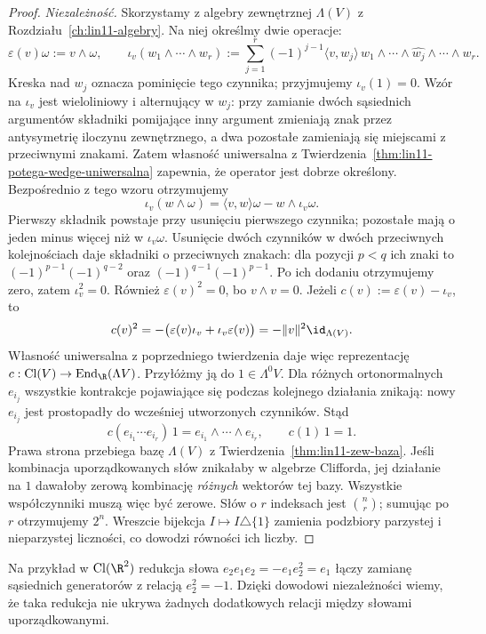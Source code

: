 \begin{proof}
\emph{Niezależność.} Skorzystamy z algebry zewnętrznej
$\Lambda(V)$ z Rozdziału~\ref{ch:lin11-algebry}.
Na niej określmy dwie operacje:
\[
 \varepsilon(v)\omega:=v\wedge\omega,\qquad
 \iota_v(w_1\wedge\cdots\wedge w_r)
 :=\sum_{j=1}^r(-1)^{j-1}
   \langle v,w_j\rangle\,
   w_1\wedge\cdots\wedge\widehat{w_j}
       \wedge\cdots\wedge w_r .
\]
Kreska nad $w_j$ oznacza pominięcie tego czynnika;
przyjmujemy $\iota_v(1)=0$.
Wzór na $\iota_v$ jest wieloliniowy i alternujący
w $w_j$: przy zamianie dwóch sąsiednich argumentów składniki
pomijające inny argument zmieniają znak przez antysymetrię iloczynu
zewnętrznego, a dwa pozostałe zamieniają się miejscami z przeciwnymi
znakami. Zatem własność uniwersalna
z Twierdzenia~\ref{thm:lin11-potega-wedge-uniwersalna}
zapewnia, że operator jest dobrze określony.
Bezpośrednio z tego wzoru otrzymujemy
\[
 \iota_v(w\wedge\omega)
  =\langle v,w\rangle\omega-w\wedge\iota_v\omega.
\]
Pierwszy składnik powstaje przy usunięciu pierwszego
czynnika; pozostałe mają o jeden minus więcej niż
w $\iota_v\omega$. Usunięcie dwóch czynników
w dwóch przeciwnych kolejnościach daje składniki
o przeciwnych znakach: dla pozycji $p<q$ ich znaki to
$(-1)^{p-1}(-1)^{q-2}$ oraz
$(-1)^{q-1}(-1)^{p-1}$. Po ich dodaniu
otrzymujemy zero, zatem $\iota_v^2=0$.
Również $\varepsilon(v)^2=0$, bo $v\wedge v=0$.
Jeżeli $c(v):=\varepsilon(v)-\iota_v$, to
\[
 c(v)^2
 =-\bigl(\varepsilon(v)\iota_v
          +\iota_v\varepsilon(v)\bigr)
 =-\|v\|^2\id_{\Lambda(V)}.
\]
Własność uniwersalna z poprzedniego twierdzenia
daje więc reprezentację
$c:\operatorname{Cl}(V)\to\operatorname{End}_\R(\Lambda V)$.
Przyłóżmy ją do $1\in\Lambda^0V$.
Dla różnych ortonormalnych $e_{i_j}$ wszystkie
kontrakcje pojawiające się podczas kolejnego
działania znikają: nowy $e_{i_j}$ jest prostopadły
do wcześniej utworzonych czynników. Stąd
\[
 c(e_{i_1}\cdots e_{i_r})\,1
    =e_{i_1}\wedge\cdots\wedge e_{i_r},\qquad
 c(1)\,1=1.
\]
Prawa strona przebiega bazę $\Lambda(V)$ z
Twierdzenia~\ref{thm:lin11-zew-baza}. Jeśli kombinacja
uporządkowanych słów znikałaby w algebrze Clifforda,
jej działanie na $1$ dawałoby zerową kombinację
\emph{różnych} wektorów tej bazy. Wszystkie
współczynniki muszą więc być zerowe.
Słów o $r$ indeksach jest $\binom nr$;
sumując po $r$ otrzymujemy $2^n$.
Wreszcie bijekcja $I\mapsto I\triangle\{1\}$
zamienia podzbiory parzystej i nieparzystej
liczności, co dowodzi równości ich liczby.
\end{proof}

Na przykład w $\operatorname{Cl}(\R^2)$ redukcja słowa
$e_2e_1e_2=-e_1e_2^2=e_1$ łączy zamianę sąsiednich
generatorów z relacją $e_2^2=-1$. Dzięki dowodowi
niezależności wiemy, że taka redukcja nie ukrywa
żadnych dodatkowych relacji między słowami uporządkowanymi.

